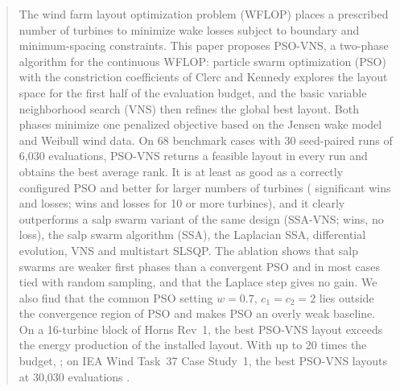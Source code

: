 \documentclass[journal,twoside]{IEEEtran}
\begin{document}
\begin{abstract}
The wind farm layout optimization problem (WFLOP) places a prescribed number of turbines to minimize wake losses subject to boundary and minimum-spacing constraints. This paper proposes PSO-VNS, a two-phase algorithm for the continuous WFLOP: particle swarm optimization (PSO) with the constriction coefficients of Clerc and Kennedy explores the layout space for the first half of the evaluation budget, and the basic variable neighborhood search (VNS) then refines the global best layout. Both phases minimize one penalized objective based on the Jensen wake model and Weibull wind data. On 68 benchmark cases with 30 seed-paired runs of 6,030 evaluations, PSO-VNS returns a feasible layout in every run and obtains the best average rank. It is at least as good as a correctly configured PSO and better for larger numbers of turbines (\NWtlPSOW{} significant wins and \NWtlPSOL{} losses; \NWtlPSOLargeW{} wins and \NWtlPSOLargeL{} losses for 10 or more turbines), and it clearly outperforms a salp swarm variant of the same design (SSA-VNS; \NWtlSSAVNSW{} wins, no loss), the salp swarm algorithm (SSA), the Laplacian SSA, differential evolution, VNS and multistart SLSQP. The ablation shows that salp swarms are weaker first phases than a convergent PSO and in most cases tied with random sampling, and that the Laplace step gives no gain. We also find that the common PSO setting $w=0.7$, $c_1=c_2=2$ lies outside the convergence region of PSO and makes PSO an overly weak baseline. On a 16-turbine block of Horns Rev~1, the best PSO-VNS layout exceeds the energy production of the installed layout. With up to 20 times the budget, \NBudgetPhrase; on IEA Wind Task~37 Case Study~1, the best PSO-VNS layouts at 30,030 evaluations \NIEAPhrase.
\end{abstract}
\end{document}
